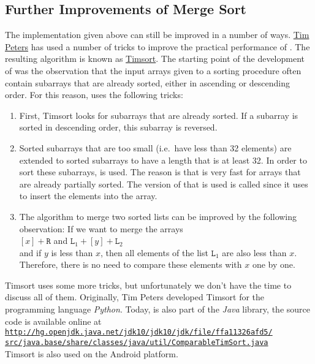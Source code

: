 \subsection{Further Improvements of Merge Sort}
The implementation given above can still be improved in a number of ways.  
\href{https://en.wikipedia.org/wiki/Tim_Peters_(software_engineer)}{Tim Peters} has used a number of tricks to improve the
practical performance of .  The resulting algorithm is known as
\href{http://en.wikipedia.org/wiki/Timsort}{Timsort}. 
The starting point of the development of  was the observation that the input arrays 
given to a sorting procedure often contain subarrays that are already sorted, either in ascending or
descending order.   For this reason,  uses the following tricks:
\begin{enumerate}
\item First, Timsort looks for subarrays that are already sorted.
      If a subarray is sorted in descending order, this subarray is reversed.
\item Sorted subarrays that are too small (i.e.~have less than 32 elements) are extended
      to sorted subarrays to have a length that is at least 32.  In order to sort these subarrays,
       is used.  The reason is that  is very fast for
      arrays that are already partially sorted.  The version of  that is used is called
       since it uses 
      \href{http://en.wikipedia.org/wiki/Binary_search}{} to insert the elements
      into the array.
\item The algorithm to merge two sorted lists can be improved by the following observation: If we
      want to merge the arrays
      \\[0.2cm]
      \hspace*{1.3cm}
      $[x] + \mathtt{R}$ \quad and \quad $\mathtt{L}_1 + [y] + \mathtt{L}_2$
      \\[0.2cm]
      and if $y$ is less than $x$, then all elements of the list $\mathtt{L}_1$ are also less than $x$.
      Therefore, there is no need to compare these elements with $x$ one by one.  
\end{enumerate}
Timsort uses some more tricks, but unfortunately we don't have the time to discuss all of them.
Originally, Tim Peters developed Timsort for the programming language \textsl{Python}.  Today,
 is also part of the \textsl{Java} library, the source code is available online at
\\[0.2cm]
\hspace*{0.3cm}
\href{http://hg.openjdk.java.net/jdk10/jdk10/jdk/file/ffa11326afd5/src/java.base/share/classes/java/util/ComparableTimSort.java}{\texttt{http://hg.openjdk.java.net/jdk10/jdk10/jdk/file/ffa11326afd5/\\
\hspace*{1.5cm}
    src/java.base/share/classes/java/util/ComparableTimSort.java}}
\\[0.2cm]
Timsort is also used on the Android platform.


